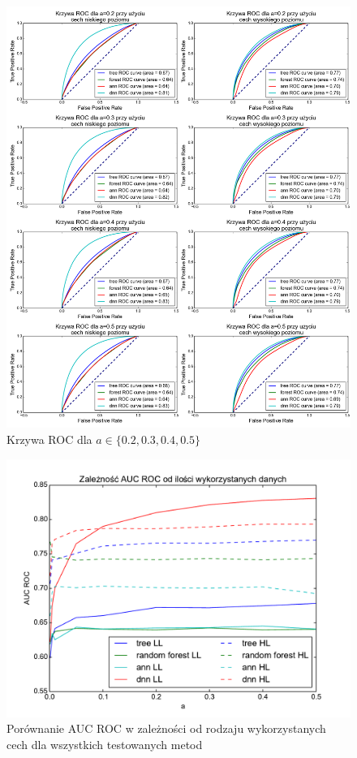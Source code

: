 \begin{figure}[ht!]
\centering
\includegraphics[scale=0.425]{res/allnew2.png}
\caption[Caption for LOF]{Krzywa ROC dla $a\in\{0.2, 0.3, 0.4, 0.5\}$\label{higgsall2}}
\end{figure} 

\begin{figure}[ht!]
\centering
\includegraphics[scale=0.8]{res/higgssummary.pdf}
\caption[Caption for LOF]{Porównanie AUC ROC w zależności od rodzaju wykorzystanych cech dla wszystkich testowanych metod\label{higgssummary}}
\end{figure} 

